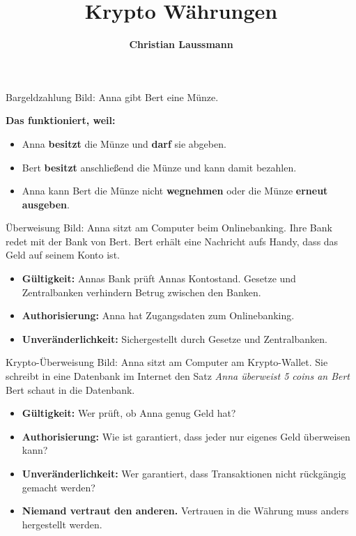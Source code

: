 \documentclass[aspectratio=169]{beamer}
\title{\textbf{\Huge Krypto Währungen}}
\author{\textcolor{secondarycolor}{\textbf{Christian Laussmann}}}
\date{}
\begin{document}
\frame{\titlepage}



\begin{frame}{Bargeldzahlung}
    Bild: Anna gibt Bert eine Münze.

    \pause
    \textbf{Das funktioniert, weil:}
    \begin{itemize}
        \item Anna \textbf{besitzt} die Münze und \textbf{darf} sie abgeben.
        \item Bert \textbf{besitzt} anschließend die Münze und kann damit bezahlen.
        \item Anna kann Bert die Münze nicht \textbf{wegnehmen} oder die Münze \textbf{erneut ausgeben}.
    \end{itemize}
\end{frame}



\begin{frame}{Überweisung}
    Bild: Anna sitzt am Computer beim Onlinebanking. Ihre Bank redet mit der Bank von Bert. Bert erhält eine Nachricht aufs Handy, dass das Geld auf seinem Konto ist.

    \pause
    \begin{itemize}
        \item \textbf{Gültigkeit:} Annas Bank prüft Annas Kontostand. Gesetze und Zentralbanken verhindern Betrug zwischen den Banken.
        \item \textbf{Authorisierung:} Anna hat Zugangsdaten zum Onlinebanking.
        \item \textbf{Unveränderlichkeit:} Sichergestellt durch Gesetze und Zentralbanken.
    \end{itemize}
\end{frame}



\begin{frame}{Krypto-Überweisung}
    Bild: Anna sitzt am Computer am Krypto-Wallet. Sie schreibt in eine Datenbank im Internet den Satz \emph{Anna überweist 5 coins an Bert} Bert schaut in die Datenbank.

    \pause
    \begin{itemize}
        \item \textbf{Gültigkeit:} Wer prüft, ob Anna genug Geld hat?
        \item \textbf{Authorisierung:} Wie ist garantiert, dass jeder nur eigenes Geld überweisen kann?
        \item \textbf{Unveränderlichkeit:} Wer garantiert, dass Transaktionen nicht rückgängig gemacht werden?
    \end{itemize}

    \vfill
    \begin{itemize}
        \item \textbf{Niemand vertraut den anderen.} Vertrauen in die Währung muss anders hergestellt werden.
    \end{itemize}
\end{frame}
\end{document}

